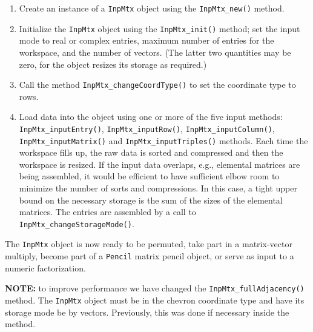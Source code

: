 \begin{enumerate}
\item
Create an instance of a {\tt InpMtx} object using
the {\tt InpMtx\_new()} method.
\item
Initialize the {\tt InpMtx} object using the {\tt InpMtx\_init()} 
method; set the input mode to real or complex entries,
maximum number of entries for the workspace, and the number of
vectors. (The latter two quantities may be zero, for the object
resizes its storage as required.)
\item
Call the method {\tt InpMtx\_changeCoordType()}
to set the coordinate type to rows.
\item
Load data into the object using one or more of the
five input methods:
{\tt InpMtx\_inputEntry()},
{\tt InpMtx\_inputRow()}, 
{\tt InpMtx\_inputColumn()},
{\tt InpMtx\_inputMatrix()} and
{\tt InpMtx\_inputTriples()} methods.
Each time the workspace fills up, the raw data is sorted and
compressed and then the workspace is resized.
If the input data overlaps, e.g., elemental matrices are being
assembled, it would be efficient to have sufficient elbow room
to minimize the number of sorts and compressions.
In this case, a tight upper bound on the necessary storage is the
sum of the sizes of the elemental matrices.
The entries are assembled 
by a call to {\tt InpMtx\_changeStorageMode()}.
\end{enumerate}
The {\tt InpMtx} object is now ready to be permuted, take part in a
matrix-vector multiply, become part of a {\tt Pencil} matrix pencil
object, or serve as input to a numeric factorization.
\par
{\bf NOTE:} to improve performance we have changed the
{\tt InpMtx\_fullAdjacency()} method.
The {\tt InpMtx} object must be in the chevron coordinate type
and have its storage mode be by vectors.
Previously, this was done if necessary inside the method.
